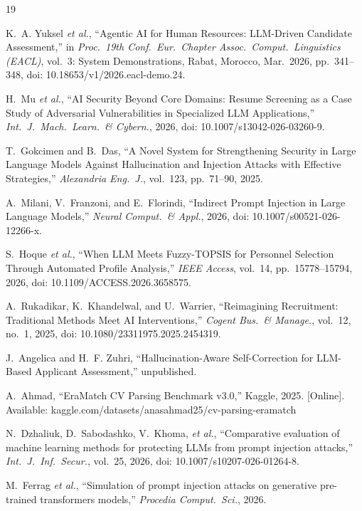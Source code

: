 \documentclass[journal]{IEEEtran}
\begin{document}
\begin{thebibliography}{19}

K.~A. Yuksel \emph{et al.}, ``Agentic AI for Human Resources: LLM-Driven Candidate Assessment,'' in \emph{Proc.\ 19th Conf.\ Eur.\ Chapter Assoc.\ Comput.\ Linguistics (EACL)}, vol.~3: System Demonstrations, Rabat, Morocco, Mar.~2026, pp.~341--348, doi: 10.18653/v1/2026.eacl-demo.24.

H.~Mu \emph{et al.}, ``AI Security Beyond Core Domains: Resume Screening as a Case Study of Adversarial Vulnerabilities in Specialized LLM Applications,'' \emph{Int.\ J.\ Mach.\ Learn.\ \& Cybern.}, 2026, doi: 10.1007/s13042-026-03260-9.

T.~Gokcimen and B.~Das, ``A Novel System for Strengthening Security in Large Language Models Against Hallucination and Injection Attacks with Effective Strategies,'' \emph{Alexandria Eng.\ J.}, vol.~123, pp.~71--90, 2025.

A.~Milani, V.~Franzoni, and E.~Florindi, ``Indirect Prompt Injection in Large Language Models,'' \emph{Neural Comput.\ \& Appl.}, 2026, doi: 10.1007/s00521-026-12266-x.

S.~Hoque \emph{et al.}, ``When LLM Meets Fuzzy-TOPSIS for Personnel Selection Through Automated Profile Analysis,'' \emph{IEEE Access}, vol.~14, pp.~15778--15794, 2026, doi: 10.1109/ACCESS.2026.3658575.

A.~Rukadikar, K.~Khandelwal, and U.~Warrier, ``Reimagining Recruitment: Traditional Methods Meet AI Interventions,'' \emph{Cogent Bus.\ \& Manage.}, vol.~12, no.~1, 2025, doi: 10.1080/23311975.2025.2454319.

J.~Angelica and H.~F. Zuhri, ``Hallucination-Aware Self-Correction for LLM-Based Applicant Assessment,'' unpublished.

A.~Ahmad, ``EraMatch CV Parsing Benchmark v3.0,'' Kaggle, 2025. [Online]. Available: kaggle.com/datasets/anasahmad25/cv-parsing-eramatch

N.~Dzhaliuk, D.~Sabodashko, V.~Khoma, \emph{et al.}, ``Comparative evaluation of machine learning methods for protecting LLMs from prompt injection attacks,'' \emph{Int.\ J.\ Inf.\ Secur.}, vol.~25, 2026, doi: 10.1007/s10207-026-01264-8.

M.~Ferrag \emph{et al.}, ``Simulation of prompt injection attacks on generative pre-trained transformers models,'' \emph{Procedia Comput.\ Sci.}, 2026.


\end{thebibliography}
\end{document}

